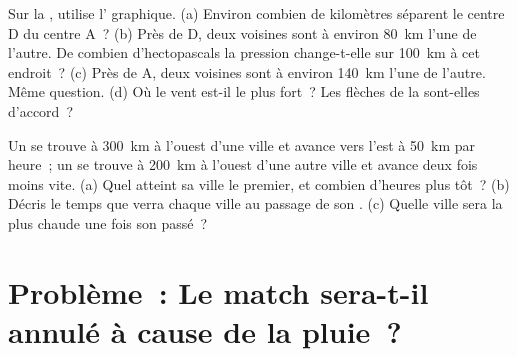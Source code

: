 \begin{exercise}[$\star\star\star$]\label{exo:g8:fronts-and-weather-maps:11}
Sur la  , utilise l' graphique. (a) Environ
combien de kilomètres séparent le centre D du centre A~? (b) Près de D,
deux  voisines sont à environ \qty{80}{km} l'une de l'autre. De
combien d'hectopascals la pression change-t-elle sur \qty{100}{km} à cet
endroit~? (c) Près de A, deux  voisines sont à environ
\qty{140}{km} l'une de l'autre. Même question. (d) Où le vent est-il le
plus fort~? Les flèches de la  sont-elles d'accord~?
\end{exercise}

\begin{exercise}[$\star\star\star$]\label{exo:g8:fronts-and-weather-maps:12}
Un  se trouve à \qty{300}{km} à l'ouest d'une ville et avance
vers l'est à \qty{50}{km} par heure~; un  se trouve à
\qty{200}{km} à l'ouest d'une autre ville et avance deux fois moins vite.
(a) Quel  atteint sa ville le premier, et combien d'heures plus
tôt~? (b) Décris le temps que verra chaque ville au passage de son .
(c) Quelle ville sera la plus chaude une fois son  passé~?
\end{exercise}

\section{Problème~: Le match sera-t-il annulé à cause de la pluie~?}

